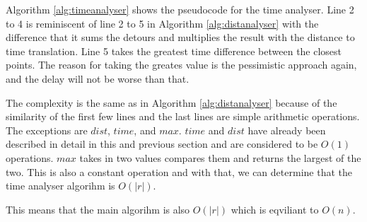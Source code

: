 Algorithm \ref{alg:timeanalyser} shows the pseudocode for the time analyser.
Line 2 to 4 is reminiscent of line 2 to 5 in Algorithm \ref{alg:distanalyser} with the difference that it sums the detours and multiplies the result with the distance to time translation.
Line 5 takes the greatest time difference between the closest points.
The reason for taking the greates value is the pessimistic approach again, and the delay will not be worse than that.

The complexity is the same as in Algorithm \ref{alg:distanalyser} because of the similarity of the first few lines and the last lines are simple arithmetic operations. 
The exceptions are $dist$, $time$, and $max$. 
$time$ and $dist$ have already been described in detail in this and previous section and are considered to be $O(1)$ operations.
$max$ takes in two values compares them and returns the largest of the two.
This is also a constant operation and with that, we can determine that the time analyser algorihm is $O(|r|)$.

This means that the main algorihm is also $O(|r|)$ which is eqviliant to $O(n)$.
